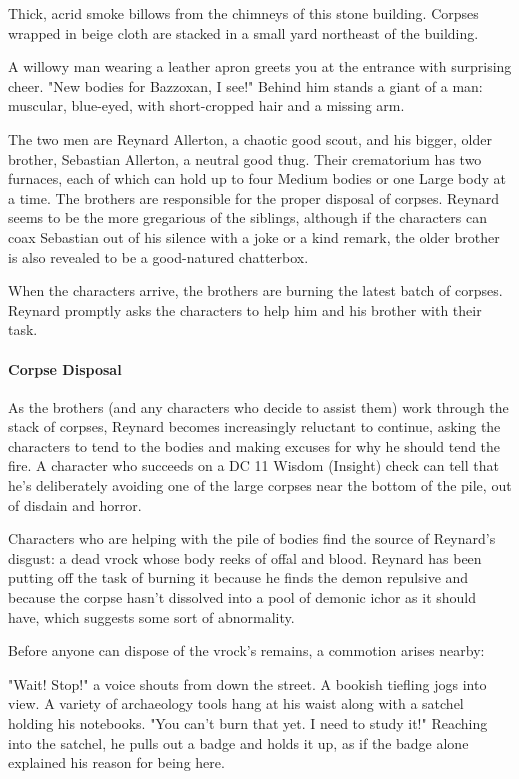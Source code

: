 \documentclass[10pt,a4paper,twoside,bg=print,twocolumn,openany,nodeprecatedcode]{dndbook}
\begin{document}
\begin{DndReadAloud}{}
Thick, acrid smoke billows from the chimneys of this stone building. Corpses wrapped in beige cloth are stacked in a small yard northeast of the building.

A willowy man wearing a leather apron greets you at the entrance with surprising cheer. "New bodies for Bazzoxan, I see!" Behind him stands a giant of a man: muscular, blue-eyed, with short-cropped hair and a missing arm.

\end{DndReadAloud}

The two men are Reynard Allerton, a chaotic good scout, and his bigger, older brother, Sebastian Allerton, a neutral good thug. Their crematorium has two furnaces, each of which can hold up to four Medium bodies or one Large body at a time. The brothers are responsible for the proper disposal of corpses. Reynard seems to be the more gregarious of the siblings, although if the characters can coax Sebastian out of his silence with a joke or a kind remark, the older brother is also revealed to be a good-natured chatterbox.

When the characters arrive, the brothers are burning the latest batch of corpses. Reynard promptly asks the characters to help him and his brother with their task.

\paragraph{Corpse Disposal}
As the brothers (and any characters who decide to assist them) work through the stack of corpses, Reynard becomes increasingly reluctant to continue, asking the characters to tend to the bodies and making excuses for why he should tend the fire. A character who succeeds on a DC 11 Wisdom (Insight) check can tell that he's deliberately avoiding one of the large corpses near the bottom of the pile, out of disdain and horror.

Characters who are helping with the pile of bodies find the source of Reynard's disgust: a dead vrock whose body reeks of offal and blood. Reynard has been putting off the task of burning it because he finds the demon repulsive and because the corpse hasn't dissolved into a pool of demonic ichor as it should have, which suggests some sort of abnormality.

Before anyone can dispose of the vrock's remains, a commotion arises nearby:

\begin{DndReadAloud}{}
"Wait! Stop!" a voice shouts from down the street. A bookish tiefling jogs into view. A variety of archaeology tools hang at his waist along with a satchel holding his notebooks. "You can't burn that yet. I need to study it!" Reaching into the satchel, he pulls out a badge and holds it up, as if the badge alone explained his reason for being here.

\end{DndReadAloud}
\end{document}
